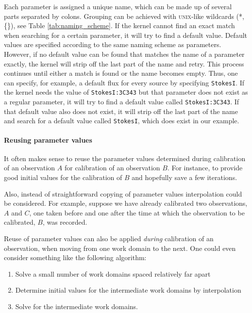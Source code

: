 \documentclass[10pt]{lofar}
\begin{document}
Each parameter is assigned a unique name, which can be made up of several parts
separated by colons. Grouping can be achieved with \textsc{unix}-like wildcards
(*, \{\}), see Table \ref{tab:naming_scheme}. If the kernel cannot find an
exact match when searching for a certain parameter, it will try to find a
default value. Default values are specified according to the same naming scheme
as parameters. However, if no default value can be found that matches the name
of a parameter exactly, the kernel will strip off the last part of the name and
retry. This process continues until either a match is found or the name becomes
empty. Thus, one can specify, for example, a default flux for every source by
specifying \texttt{StokesI}. If the kernel needs the value of
\texttt{StokesI:3C343} but that parameter does not exist as a regular parameter,
it will try to find a default value called \texttt{StokesI:3C343}. If that
default value also does not exist, it will strip off the last part of the name
and search for a default value called \texttt{StokesI}, which does exist in our
example.

\paragraph{Reusing parameter values}
It often makes sense to reuse the parameter values determined during
calibration of an observation $A$ for calibration of an observation $B$. For
instance, to provide good initial values for the calibration of $B$ and
hopefully save a few iterations.

Also, instead of straightforward copying of parameter values interpolation could
be considered. For example, suppose we have already calibrated two observations,
$A$ and $C$, one taken before and one after the time at which the observation to
be calibrated, $B$, was recorded.

Reuse of parameter values can also be applied \emph{during} calibration of an
observation, when moving from one work domain to the next. One could even
consider something like the following algorithm:
\begin{enumerate}
\item Solve a small number of work domains spaced relatively far apart
\item Determine initial values for the intermediate work domains by
interpolation
\item Solve for the intermediate work domains.
\end{enumerate}
\end{document}

